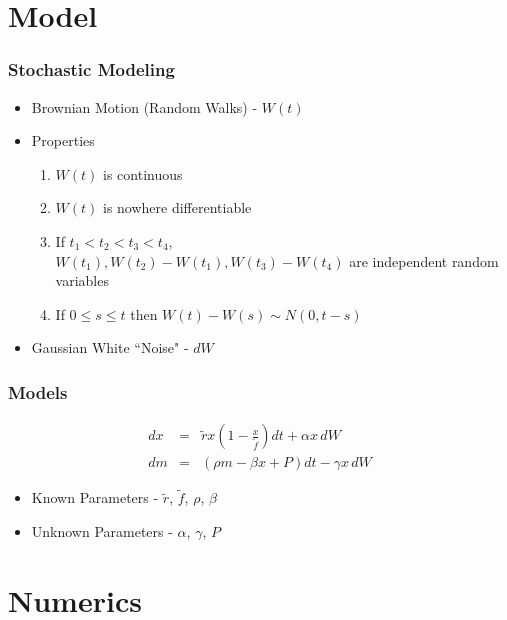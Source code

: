 
\section{Model}

\begin{frame}
    \frametitle{Stochastic Modeling}
	\begin{itemize}
		\item Brownian Motion (Random Walks) - $W(t)$
		\item Properties
	\begin{enumerate}[i]
		\item $W(t)$ is continuous
		\item $W(t)$ is nowhere differentiable
		\item If $t_{1}<t_{2}<t_{3}<t_{4}$, \\
			$W(t_{1}), W(t_{2})-W(t_{1}),  W(t_{3})-W(t_{4})$ are independent random variables
		\item If $0 \le s\le t$ then $W(t)-W(s) \sim N(0, t-s)$
	\end{enumerate}
		\item Gaussian White ``Noise" - $dW$
	\end{itemize}
\end{frame}



\begin{frame}
    \frametitle{Models}
	\begin{eqnarray}
		dx &=& \tilde{r} x \left( 1- \frac{x}{\tilde{f}}\right) dt +\alpha x \, dW \\
		dm &=& ( \rho m - \beta x + P) dt - \gamma x \, dW
	\end{eqnarray}
	\begin{itemize}
		\item Known Parameters - $\tilde{r}$, $\tilde{f}$, $\rho$, $\beta$
		\item Unknown Parameters - $\alpha$, $\gamma$, $P$
	\end{itemize}
\end{frame}




\section{Numerics}

